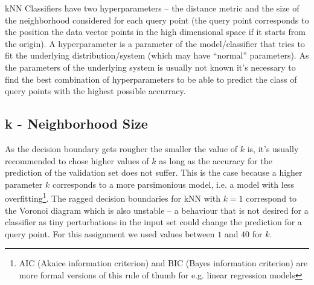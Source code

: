 kNN Classifiers have two hyperparameters -- the distance metric and the size of the neighborhood considered for each query point (the query point corresponds to the position the data vector points in the high dimensional space if it starts from the origin). A hyperparameter is a parameter of the model/classifier that tries to fit the underlying distribution/system (which may have ``normal'' parameters). As the parameters of the underlying system is usually not known it's necessary to find the best combination of hyperparameters to be able to predict the class of query points with the highest possible accurracy. 
\subsection{k - Neighborhood Size}
As the decision boundary gets rougher the smaller the value of $k$ is, it's usually recommended to chose higher values of $k$ as long as the accuracy for the prediction of the validation set does not suffer. This is the case because a higher parameter $k$ corresponds to a more parsimonious model, i.e. a model with less overfitting\footnote{AIC (Akaice information criterion) and BIC (Bayes information criterion) are more formal versions of this rule of thumb for e.g. linear regression models}. The ragged decision boundaries for kNN with $k =1$ correspond to the Voronoi diagram which is also unstable -- a behaviour that is not desired for a classifier as tiny perturbations in the input set could change the prediction for a query point. For this assignment we used values between $1$ and $40$ for $k$. 
